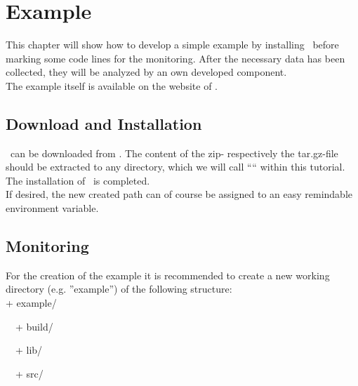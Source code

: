   \chapter{Example}
    This chapter will show how to develop a simple example by installing \Kieker\ before marking some code lines for the monitoring. After the necessary data has been collected, they will be analyzed by an own developed component.\\
    The example itself is available on the website of \Kieker.
    \section{Download and Installation}
      \Kieker\ can be downloaded from \KiekerDownloadUrl. The content of the zip- respectively the tar.gz-file should be extracted to any directory, which we will call ``\KiekerDir`` within this tutorial. The installation of \Kieker\ is completed.\\
      If desired, the new created path can of course be assigned to an easy remindable environment variable. 

    \section{Monitoring}
      For the creation of the example it is recommended to create a new working directory (e.g. ''example'') of the following structure:\\

        + example/

      \ \ + build/

      \ \ + lib/

      \ \ + src/\\
      
